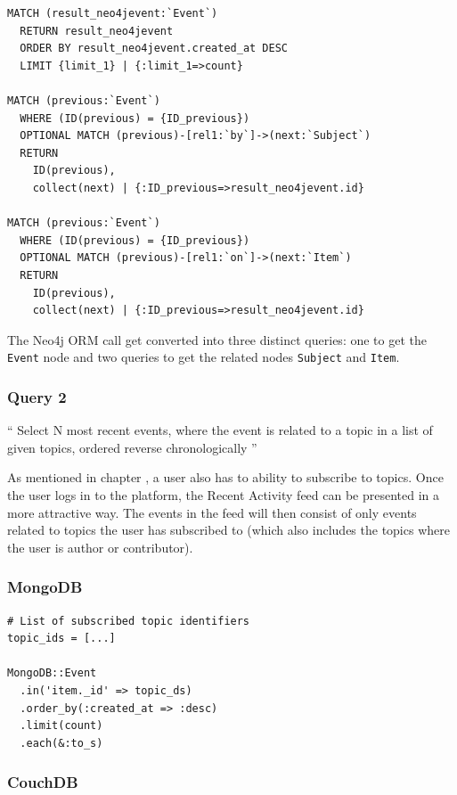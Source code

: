 \begin{verbatim}
MATCH (result_neo4jevent:`Event`)
  RETURN result_neo4jevent
  ORDER BY result_neo4jevent.created_at DESC
  LIMIT {limit_1} | {:limit_1=>count}

MATCH (previous:`Event`)
  WHERE (ID(previous) = {ID_previous})
  OPTIONAL MATCH (previous)-[rel1:`by`]->(next:`Subject`)
  RETURN
    ID(previous),
    collect(next) | {:ID_previous=>result_neo4jevent.id}

MATCH (previous:`Event`)
  WHERE (ID(previous) = {ID_previous})
  OPTIONAL MATCH (previous)-[rel1:`on`]->(next:`Item`)
  RETURN
    ID(previous),
    collect(next) | {:ID_previous=>result_neo4jevent.id}
\end{verbatim}

The Neo4j ORM call get converted into three distinct queries: one to get the \texttt{Event} node and two queries to get the related nodes \texttt{Subject} and \texttt{Item}.

\subsubsection{Query 2}
\label{subsubsec:query-2}

``
Select N most recent events, where the event is related to a topic in a list of given topics, ordered reverse chronologically
''

As mentioned in chapter , a user also has to ability to subscribe to topics.
Once the user logs in to the platform, the Recent Activity feed can be presented in a more attractive way.
The events in the feed will then consist of only events related to topics the user has subscribed to (which also includes the topics where the user is author or contributor).

\subsubsection*{MongoDB}

\begin{verbatim}
# List of subscribed topic identifiers
topic_ids = [...]

MongoDB::Event
  .in('item._id' => topic_ds)
  .order_by(:created_at => :desc)
  .limit(count)
  .each(&:to_s)
\end{verbatim}

\subsubsection*{CouchDB}

